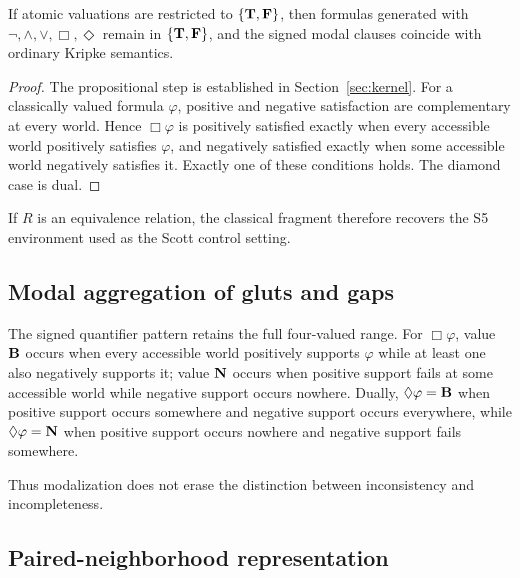 \begin{proposition}
If atomic valuations are restricted to \(\{\mathbf{T},\mathbf{F}\}\), then formulas generated with \(\neg,\land,\lor,\Box,\Diamond\) remain in \(\{\mathbf{T},\mathbf{F}\}\), and the signed modal clauses coincide with ordinary Kripke semantics.
\end{proposition}
\begin{proof}
The propositional step is established in Section~\ref{sec:kernel}. For a classically valued formula \(\varphi\), positive and negative satisfaction are complementary at every world. Hence \(\Box\varphi\) is positively satisfied exactly when every accessible world positively satisfies \(\varphi\), and negatively satisfied exactly when some accessible world negatively satisfies it. Exactly one of these conditions holds. The diamond case is dual.
\end{proof}

If \(R\) is an equivalence relation, the classical fragment therefore recovers the S5 environment used as the Scott control setting.

\subsection{Modal aggregation of gluts and gaps}

The signed quantifier pattern retains the full four-valued range. For \(\Box\varphi\), value \(\mathbf{B}\) occurs when every accessible world positively supports \(\varphi\) while at least one also negatively supports it; value \(\mathbf{N}\) occurs when positive support fails at some accessible world while negative support occurs nowhere. Dually, \(\Diamond\varphi=\mathbf{B}\) when positive support occurs somewhere and negative support occurs everywhere, while \(\Diamond\varphi=\mathbf{N}\) when positive support occurs nowhere and negative support fails somewhere.

Thus modalization does not erase the distinction between inconsistency and incompleteness.

\subsection{Paired-neighborhood representation}

